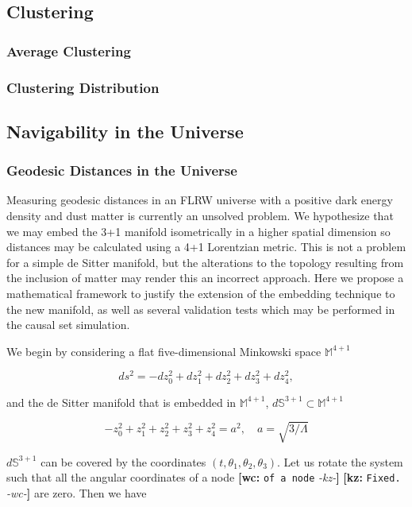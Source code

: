 \documentclass[preprint,notitlepage,amsmath,amssymb,floatfix]{revtex4-1}
\newcommand{\XXX}[3]{{\bf [#1: } {\tt #3} {\it -#2-}{\bf ]}}
\begin{document}
\subsection{Clustering}
\subsubsection{Average Clustering}
\subsubsection{Clustering Distribution}

\subsection{Navigability in the Universe}
\subsubsection{Geodesic Distances in the Universe}
Measuring geodesic distances in an FLRW universe with a positive dark energy density and dust matter is currently an unsolved problem.  
We hypothesize that we may embed the 3+1 manifold isometrically in a higher spatial dimension so distances may be calculated using a 4+1 Lorentzian metric.  
This is not a problem for a simple de Sitter manifold, but the alterations to the topology resulting from the inclusion of matter may render this an incorrect approach.  
Here we propose a mathematical framework to justify the extension of the embedding technique to the new manifold, as well as several validation tests which may be performed in the causal set simulation. \par
We begin by considering a flat five-dimensional Minkowski space $\mathbb{M}^{4+1}$

\begin{equation}
ds^2 = -dz_0^2 + dz_1^2 + dz_2^2 + dz_3^2 + dz_4^2,
\end{equation}

\noindent and the de Sitter manifold that is embedded in $\mathbb{M}^{4+1}$, $d\mathbb{S}^{3+1}\subset\mathbb{M}^{4+1}$

\begin{equation}
-z_0^2 + z_1^2 + z_2^2 + z_3^2 + z_4^2 = a^2, \quad a = \sqrt{3/\Lambda}
\end{equation}

\noindent $d\mathbb{S}^{3+1}$ can be covered by the coordinates $\left(t,\theta_1,\theta_2,\theta_3\right)$.  Let us rotate the system such that all the angular coordinates of a node \XXX{wc}{kz}{of a node} \XXX{kz}{wc}{Fixed.} are zero.  Then we have
\end{document}
